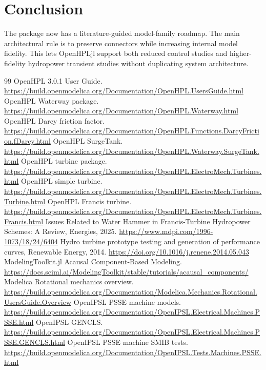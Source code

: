 \documentclass[10pt,a4paper]{article}
\begin{document}
\section*{Conclusion}
The package now has a literature-guided model-family roadmap. The main architectural rule is to preserve connectors while increasing internal model fidelity. This lets OpenHPLjl support both reduced control studies and higher-fidelity hydropower transient studies without duplicating system architecture.

\begin{thebibliography}{99}
 OpenHPL 3.0.1 User Guide. \url{https://build.openmodelica.org/Documentation/OpenHPL.UsersGuide.html}
 OpenHPL Waterway package. \url{https://build.openmodelica.org/Documentation/OpenHPL.Waterway.html}
 OpenHPL Darcy friction factor. \url{https://build.openmodelica.org/Documentation/OpenHPL.Functions.DarcyFriction.fDarcy.html}
 OpenHPL SurgeTank. \url{https://build.openmodelica.org/Documentation/OpenHPL.Waterway.SurgeTank.html}
 OpenHPL turbine package. \url{https://build.openmodelica.org/Documentation/OpenHPL.ElectroMech.Turbines.html}
 OpenHPL simple turbine. \url{https://build.openmodelica.org/Documentation/OpenHPL.ElectroMech.Turbines.Turbine.html}
 OpenHPL Francis turbine. \url{https://build.openmodelica.org/Documentation/OpenHPL.ElectroMech.Turbines.Francis.html}
 Issues Related to Water Hammer in Francis-Turbine Hydropower Schemes: A Review, Energies, 2025. \url{https://www.mdpi.com/1996-1073/18/24/6404}
 Hydro turbine prototype testing and generation of performance curves, Renewable Energy, 2014. \url{https://doi.org/10.1016/j.renene.2014.05.043}
 ModelingToolkit.jl Acausal Component-Based Modeling. \url{https://docs.sciml.ai/ModelingToolkit/stable/tutorials/acausal_components/}
 Modelica Rotational mechanics overview. \url{https://build.openmodelica.org/Documentation/Modelica.Mechanics.Rotational.UsersGuide.Overview}
 OpenIPSL PSSE machine models. \url{https://build.openmodelica.org/Documentation/OpenIPSL.Electrical.Machines.PSSE.html}
 OpenIPSL GENCLS. \url{https://build.openmodelica.org/Documentation/OpenIPSL.Electrical.Machines.PSSE.GENCLS.html}
 OpenIPSL PSSE machine SMIB tests. \url{https://build.openmodelica.org/Documentation/OpenIPSL.Tests.Machines.PSSE.html}
\end{thebibliography}
\end{document}
